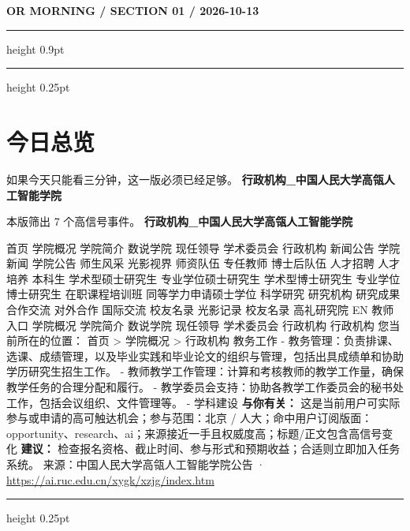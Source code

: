 \documentclass[10.5pt]{ctexart}
\begin{document}
{\small\bfseries OR MORNING / SECTION 01 / 2026-10-13}
\vspace{2mm}
\hrule height 0.9pt
\vspace{1.5mm}
\hrule height 0.25pt
\vspace{4mm}
\section*{今日总览}
{\color{ormuted} 如果今天只能看三分钟，这一版必须已经足够。}
\vspace{2mm}
{\fontsize{25}{29}\selectfont\bfseries 行政机构\_中国人民大学高瓴人工智能学院}\par
\vspace{2mm}
{\large 本版筛出 7 个高信号事件。}
\vspace{3mm}
{\Large\bfseries 行政机构\_中国人民大学高瓴人工智能学院}\par
首页 学院概况 学院简介 数说学院 现任领导 学术委员会 行政机构 新闻公告 学院新闻 学院公告 师生风采 光影视界 师资队伍 专任教师 博士后队伍 人才招聘 人才培养 本科生 学术型硕士研究生 专业学位硕士研究生 学术型博士研究生 专业学位博士研究生 在职课程培训班 同等学力申请硕士学位 科学研究 研究机构 研究成果 合作交流 对外合作 国际交流 校友名录 光影记录 校友名录 高礼研究院 EN 教师入口 学院概况 学院简介 数说学院 现任领导 学术委员会 行政机构 行政机构 您当前所在的位置： 首页 > 学院概况 > 行政机构 教务工作 - 教务管理：负责排课、选课、成绩管理，以及毕业实践和毕业论文的组织与管理，包括出具成绩单和协助学历研究生招生工作。 - 教师教学工作管理：计算和考核教师的教学工作量，确保教学任务的合理分配和履行。 - 教学委员会支持：协助各教学工作委员会的秘书处工作，包括会议组织、文件管理等。 - 学科建设
\textbf{与你有关：} 这是当前用户可实际参与或申请的高可触达机会；参与范围：北京 / 人大；命中用户订阅版面：opportunity、research、ai；来源接近一手且权威度高；标题/正文包含高信号变化
\textbf{建议：} 检查报名资格、截止时间、参与形式和预期收益；合适则立即加入任务系统。
{\footnotesize\color{ormuted} 来源：中国人民大学高瓴人工智能学院公告 · \url{https://ai.ruc.edu.cn/xygk/xzjg/index.htm}}
\vspace{3mm}
\hrule height 0.25pt
\vspace{3mm}
\end{document}
